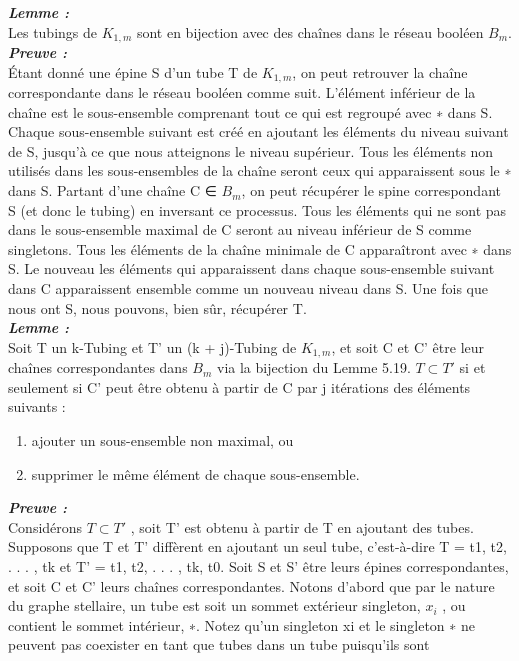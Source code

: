 \documentclass{book}
\begin{document}
\textbf{\textit{Lemme :}}\\
Les tubings de $K_{1,m}$ sont en bijection avec des chaînes dans le réseau booléen $B_m$.\\
\textbf{\textit{Preuve :}}\\
Étant donné une épine S d'un tube T de $K_{1,m}$, on peut retrouver la chaîne correspondante dans le 
réseau booléen comme suit. L'élément inférieur de la chaîne est le sous-ensemble comprenant tout ce qui est regroupé
avec ∗ dans S. Chaque sous-ensemble suivant est créé en ajoutant les éléments du niveau suivant de S, jusqu'à ce que
nous atteignons le niveau supérieur. Tous les éléments non utilisés dans les sous-ensembles de la chaîne seront ceux qui apparaissent
sous le ∗ dans S.
Partant d'une chaîne C ∈ $B_m$, on peut récupérer le spine correspondant S (et donc le tubing)
en inversant ce processus. Tous les éléments qui ne sont pas dans le sous-ensemble maximal de C seront au niveau inférieur
de S comme singletons. Tous les éléments de la chaîne minimale de C apparaîtront avec ∗ dans S. Le nouveau
les éléments qui apparaissent dans chaque sous-ensemble suivant dans C apparaissent ensemble comme un nouveau niveau dans S. Une fois que nous
ont S, nous pouvons, bien sûr, récupérer T.\\
\textbf{\textit{Lemme :}}\\
Soit T un k-Tubing et T'
un (k + j)-Tubing de $K_{1,m}$, et soit C et C'
être leur
chaînes correspondantes dans $B_m$ via la bijection du Lemme 5.19. $T \subset T'$
si et seulement si C'
peut être obtenu à partir de C par j itérations des éléments suivants :\\
\begin{enumerate}
  \item ajouter un sous-ensemble non maximal, ou
  \item supprimer le même élément de chaque sous-ensemble.
\end{enumerate}
\textbf{\textit{Preuve :}}\\
Considérons $T \subset T'$
, soit T'
est obtenu à partir de T en ajoutant des tubes. Supposons que T et T' diffèrent
en ajoutant un seul tube, c'est-à-dire T = {t1, t2, . . . , tk} et T' = {t1, t2, . . . , tk, t0}. Soit S et S' être leurs épines correspondantes, et soit C et C' leurs chaînes correspondantes. Notons d'abord que par le
nature du graphe stellaire, un tube est soit un sommet extérieur singleton, $x_i$
, ou contient le sommet intérieur,
∗. Notez qu'un singleton xi et le singleton ∗ ne peuvent pas coexister en tant que tubes dans un tube puisqu'ils sont
\end{document}
